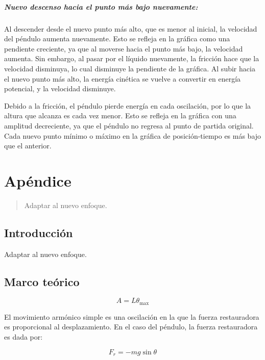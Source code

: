 \documentclass[letterpaper]{report}
\numberwithin{table}{section}
\begin{document}
\paragraph{Nuevo descenso hacia el punto más bajo nuevamente:} Al
descender desde el nuevo punto más alto, que es menor al inicial, la
velocidad del péndulo aumenta nuevamente. Esto se refleja en la
gráfica como una pendiente creciente, ya que al moverse hacia el
punto más bajo, la velocidad aumenta. Sin embargo, al pasar por el
líquido nuevamente, la fricción hace que la velocidad disminuya, lo
cual disminuye la pendiente de la gráfica. Al subir hacia el nuevo
punto más alto, la energía cinética se vuelve a convertir en energía
potencial, y la velocidad disminuye.

Debido a la fricción, el péndulo pierde energía en cada oscilación,
por lo que la altura que alcanza es cada vez menor. Esto se refleja
en la gráfica con una amplitud decreciente, ya que el péndulo no
regresa al punto de partida original. Cada nuevo punto mínimo o
máximo en la gráfica de posición-tiempo es más bajo que el anterior.

\chapter{Apéndice}

\begin{abstract}
  {\color{red} Adaptar al nuevo enfoque.}
\end{abstract}

\section{Introducción}

{\color{red}Adaptar al nuevo enfoque.}

\section{Marco teórico}

\begin{equation}
  A = L\theta_{\max}
\end{equation}

El movimiento armónico simple es una oscilación en la que la fuerza restauradora
es proporcional al desplazamiento. En el caso del péndulo, la fuerza
restauradora es dada por:

\begin{equation}\label{eq:restauradora}
  F_{r} = -mg\sin{\theta}
\end{equation}
\end{document}
